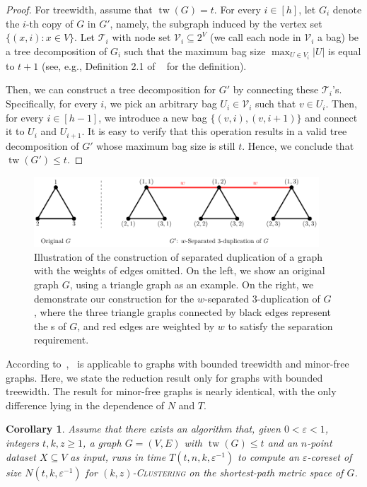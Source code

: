 \documentclass[letterpaper,11pt]{article}
\theoremstyle{plain}
\newtheorem{corollary}[theorem]{Corollary}
\theoremstyle{definition}
\theoremstyle{remark}
\DeclareMathOperator{\tw}{tw}
\newcommand{\eps}{\varepsilon}
\newcommand{\calT}{\mathcal{T}}
\newcommand{\calV}{\mathcal{V}}
\newcommand{\ProblemName}[1]{\textsc{#1}}
\newcommand{\kzC}{\ProblemName{$(k,z)$-Clustering}\xspace}
\begin{document}
\begin{appendices}
\begin{proof}
    For treewidth, assume that $\tw(G) = t$.
    For every $i\in [h]$, let $G_i$ denote the $i$-th copy of $G$ in $G'$, namely, the subgraph induced by the vertex set $\{(x,i):x\in V\}$. Let $\mathcal{T}_i$ with node set $\calV_i\subseteq 2^V$ (we call each node in $\calV_i$ a bag) be a tree decomposition of $G_i$ such that the maximum bag size $\max_{U\in V_i}|U|$ is equal to $t + 1$ (see, e.g., Definition 2.1 of ~\cite{DBLP:conf/icml/BakerBHJK020} for the definition).

    Then, we can construct a tree decomposition for $G'$ by connecting these $\calT_i$'s. Specifically, for every $i$, we pick an arbitrary bag $U_i\in\calV_i$ such that $v\in U_i$. Then, for every $i\in [h-1]$, we introduce a new bag $\{(v,i),(v,i+1)\}$ and connect it to $U_i$ and $U_{i+1}$. It is easy to verify that this operation results in a valid 
    tree decomposition of $G'$ whose maximum bag size is still $t$. Hence, we conclude that $\tw(G') \leq t$.
\end{proof}


\begin{figure}[t]
	\centering
	\includegraphics[width=0.95\textwidth]{fig/1.pdf}	
	\caption{
        Illustration of the construction of separated duplication of a graph with the weights of edges omitted. On the left, we show an original graph $G$, using a triangle graph as an example. On the right, we demonstrate our construction for the $w$-separated $3$-duplication of $G$, where the three triangle graphs connected by black edges represent the s of $G$, and red edges are weighted by $w$ to satisfy the separation requirement.    
	}
	\label{fig:SeparatedDuplication}
	
\end{figure}

According to~,~ is applicable to graphs with bounded treewidth and minor-free graphs. Here, we state the reduction result only for graphs with bounded treewidth. 
The result for minor-free graphs is nearly identical, with the only difference lying in the dependence of $N$ and $T$.

\begin{corollary}
    \label{cor:treewidth}
    Assume that there exists an algorithm that, given $0<\eps<1$, integers $t,k,z\ge 1$, a graph $G=(V,E)$ with $\tw(G)\le t$ and an $n$-point dataset $X\subseteq V$ as input, runs in time $T(t,n,k,\eps^{-1})$ to compute an $\eps$-coreset of size $N(t,k,\eps^{-1})$ for \kzC on the shortest-path metric space of $G$.
    

\end{corollary}
\end{appendices}
\end{document}
